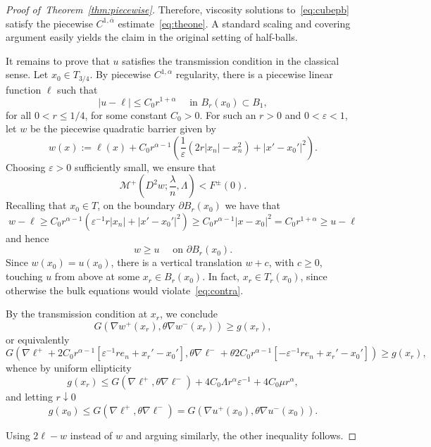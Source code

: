 \documentclass[letter,11pt]{amsart}
\newcommand{\vep}{\varepsilon}
\newcommand{\mcal}{\mathcal{M}}
\theoremstyle{definition}
\numberwithin{equation}{section}
\begin{document}
\begin{proof}[Proof of~Theorem~\ref{thm:piecewise}]
\medskip

Therefore, viscosity solutions to~\eqref{eq:cubepb} satisfy the piecewise $C^{1,\overline{\alpha}}$ estimate~\eqref{eq:theone}.
A standard scaling and covering argument easily  yields the claim in the original setting of half-balls.

\medskip

It remains to prove that $u$ satisfies the transmission condition in the classical sense.
Let $x_0 \in T_{3/4}$.
By piecewise $C^{1,\alpha}$ regularity, there is a piecewise linear function $\ell$ such that
\[
|u - \ell| \leq C_0 r^{1+\alpha} \quad \text{ in } B_r(x_0) \subset B_1,
\]
for all $0< r \leq 1/4$, for some constant $C_0 >0$.
For such an $r> 0$ and $0 < \vep < 1$, let $w$ be the piecewise quadratic barrier given by
\[
w(x) := \ell(x) 
+ C_0 r^{\alpha-1} \left( \frac{1}{\vep} \left(2 r |x_n| -  x_n^2 \right)
+ |x'- x_0'|^2 \right).
\]
Choosing $\vep > 0$ sufficiently small, we ensure that
\begin{equation}
\label{eq:contra}
\textstyle
\mcal^{+} (D^2 w; \frac{\lambda}{n}, \Lambda) < F^{\pm}(0).
\end{equation}
Recalling that $x_0 \in T$, on the boundary $\partial B_r(x_0)$ we have that
\[
w - \ell 
\geq C_0 r^{\alpha-1} \left( 
\vep^{-1} 
r |x_n| + |x'-x_0'|^2\right)
\geq C_0 r^{\alpha-1} |x- x_0|^2 = C_0 r^{1 +\alpha} \geq u - \ell
\]
and hence
\[
w \geq u \quad \text{ on } \partial B_r(x_0).
\]
Since $w(x_0) = u(x_0)$, there is a vertical translation $w + c$, with $c \geq 0$, touching $u$ from above at some $x_r \in B_r(x_0)$.
In fact, $x_r \in T_r(x_0)$, since otherwise the bulk equations would violate~\eqref{eq:contra}.

\medskip

By the transmission condition at $x_r$, we conclude
\[
G(\nabla w^{+}(x_r), \theta \nabla w^{-}(x_r)) \geq g(x_r),
\]
or equivalently
\[
G(\nabla \ell^{+} + 2 C_0 r^{\alpha-1}[ \vep^{-1} r e_n + x_r'-x_0'], \theta 
\nabla \ell^{-}
+ \theta 2 C_0 r^{\alpha-1}[ - \vep^{-1} r e_n + x_r'-x_0']
) \geq g(x_r),
\]
whence by uniform ellipticity
\[
g(x_r) \leq G(\nabla \ell^{+}, \theta \nabla \ell^{-}) + 4C_0 \Lambda r^{\alpha} \vep^{-1} + 4 C_0 \mu r^{\alpha},
\]
and letting $r \downarrow 0$
\[
g(x_0) \leq G(\nabla \ell^{+}, \theta \nabla \ell^{-}) = G(\nabla u^{+}(x_0), \theta \nabla u^{-}(x_0)).
\]

\medskip

Using $2 \ell- w$ instead of $w$ and arguing similarly, the other inequality follows.
\end{proof}
\end{document}
